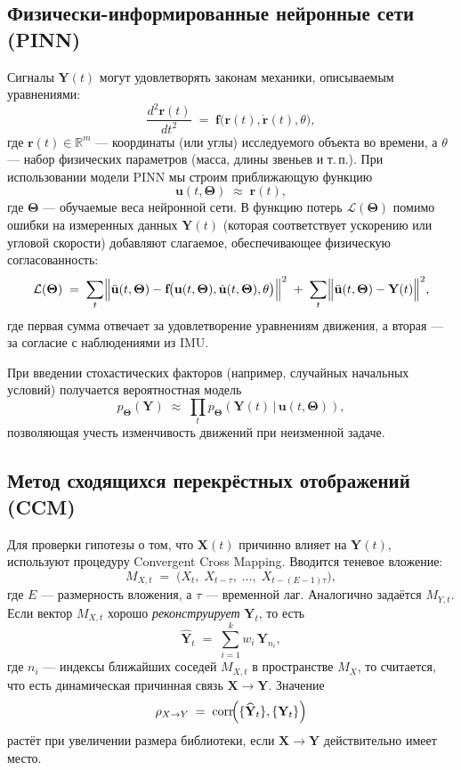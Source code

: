 \documentclass[a4paper, 12pt]{article}
\begin{document}
	\subsection{Физически-информированные нейронные сети (PINN)}
	
	Сигналы $\mathbf{Y}(t)$ могут удовлетворять законам механики, описываемым уравнениями:
	\[
	\frac{d^2 \mathbf{r}(t)}{dt^2} \;=\; \mathbf{f}\!\bigl(\mathbf{r}(t), \dot{\mathbf{r}}(t), \theta\bigr),
	\]
	где $\mathbf{r}(t) \in \mathbb{R}^m$ --- координаты (или углы) исследуемого объекта во времени, а $\theta$ --- набор физических параметров (масса, длины звеньев и т.\,п.). При использовании модели PINN мы строим приближающую функцию
	\[
	\mathbf{u}(t,\boldsymbol{\Theta}) \;\approx\; \mathbf{r}(t),
	\]
	где $\boldsymbol{\Theta}$ --- обучаемые веса нейронной сети. В функцию потерь $\mathcal{L}(\boldsymbol{\Theta})$ помимо ошибки на измеренных данных $\mathbf{Y}(t)$ (которая соответствует ускорению или угловой скорости) добавляют слагаемое, обеспечивающее физическую согласованность:
	\[
	\mathcal{L}(\boldsymbol{\Theta})
	\;=\;
	\sum_{t}\Bigl\|\ddot{\mathbf{u}}(t,\boldsymbol{\Theta})-\mathbf{f}\!\bigl(\mathbf{u}(t,\boldsymbol{\Theta}),\dot{\mathbf{u}}(t,\boldsymbol{\Theta}),\theta\bigr)\Bigr\|^2
	\;+\;
	\sum_{t}\Bigl\|\ddot{\mathbf{u}}(t,\boldsymbol{\Theta})-\mathbf{Y}(t)\Bigr\|^2,
	\]
	где первая сумма отвечает за удовлетворение уравнениям движения, а вторая --- за согласие с наблюдениями из IMU.
	
	При введении стохастических факторов (например, случайных начальных условий) получается вероятностная модель
	\[
	p_{\boldsymbol{\Theta}}(\mathbf{Y}) 
	\;\approx\;
	\prod_{t} p_{\boldsymbol{\Theta}}(\mathbf{Y}(t) \,\vert\, \mathbf{u}(t,\boldsymbol{\Theta})),
	\]
	позволяющая учесть изменчивость движений при неизменной задаче.
	
	\subsection{Метод сходящихся перекрёстных отображений (CCM)}
	
	Для проверки гипотезы о том, что $\mathbf{X}(t)$ причинно влияет на $\mathbf{Y}(t)$, используют процедуру Convergent Cross Mapping. Вводится теневое вложение:
	\[
	M_{X,t} 
	\;=\;
	\bigl(X_t,\;X_{t-\tau},\;\dots,\;X_{t-(E-1)\tau}\bigr),
	\]
	где $E$ --- размерность вложения, а $\tau$ --- временной лаг. Аналогично задаётся $M_{Y,t}$. Если вектор $M_{X,t}$ хорошо \emph{реконструирует} $\mathbf{Y}_t$, то есть
	\[
	\widehat{\mathbf{Y}}_t 
	\;=\; 
	\sum_{i=1}^{k} w_i \,\mathbf{Y}_{n_i},
	\]
	где $n_i$ --- индексы ближайших соседей $M_{X,t}$ в пространстве $M_X$, то считается, что есть динамическая причинная связь $\mathbf{X}\to \mathbf{Y}$. Значение 
	\[
	\rho_{X\to Y}
	\;=\;
	\mathrm{corr}\!\Bigl(\{\widehat{\mathbf{Y}}_t\},\{\mathbf{Y}_t\}\Bigr)
	\]
	растёт при увеличении размера библиотеки, если $\mathbf{X}\to \mathbf{Y}$ действительно имеет место.
	
\end{document}
